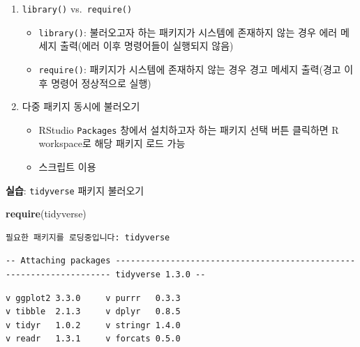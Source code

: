 \documentclass[
  11pt,
]{krantz}
\newenvironment{Shaded}{\begin{snugshade}}{\end{snugshade}}
\newcommand{\KeywordTok}[1]{\textcolor[rgb]{0.27,0.27,0.27}{\textbf{#1}}}
\newcommand{\NormalTok}[1]{#1}
\providecommand{\tightlist}{%
  \setlength{\itemsep}{0pt}\setlength{\parskip}{0pt}}
\let\BeginKnitrBlock\begin \let\EndKnitrBlock\end
\begin{document}
\begin{enumerate}
\def\labelenumi{\arabic{enumi}.}
\tightlist
\item
  \texttt{library()} vs.~\texttt{require()}

  \begin{itemize}
  \tightlist
  \item
    \texttt{library()}: 불러오고자 하는 패키지가 시스템에 존재하지 않는 경우 에러 메세지 출력(에러 이후 명령어들이 실행되지 않음)
  \item
    \texttt{require()}: 패키지가 시스템에 존재하지 않는 경우 경고 메세지 출력(경고 이후 명령어 정상적으로 실행)
  \end{itemize}
\item
  다중 패키지 동시에 불러오기

  \begin{itemize}
  \tightlist
  \item
    RStudio \texttt{Packages} 창에서 설치하고자 하는 패키지 선택 버튼 클릭하면 R workspace로 해당 패키지 로드 가능
  \item
    스크립트 이용
  \end{itemize}
\end{enumerate}

\footnotesize

\BeginKnitrBlock{rmdimportant}
\textbf{실습}: \texttt{tidyverse} 패키지 불러오기
\EndKnitrBlock{rmdimportant}

\normalsize

\footnotesize

\begin{Shaded}
\begin{Highlighting}[]
\KeywordTok{require}\NormalTok{(tidyverse)}
\end{Highlighting}
\end{Shaded}

\begin{verbatim}
필요한 패키지를 로딩중입니다: tidyverse
\end{verbatim}

\begin{verbatim}
-- Attaching packages --------------------------------------------------------------------- tidyverse 1.3.0 --
\end{verbatim}

\begin{verbatim}
v ggplot2 3.3.0     v purrr   0.3.3
v tibble  2.1.3     v dplyr   0.8.5
v tidyr   1.0.2     v stringr 1.4.0
v readr   1.3.1     v forcats 0.5.0
\end{verbatim}
\end{document}
